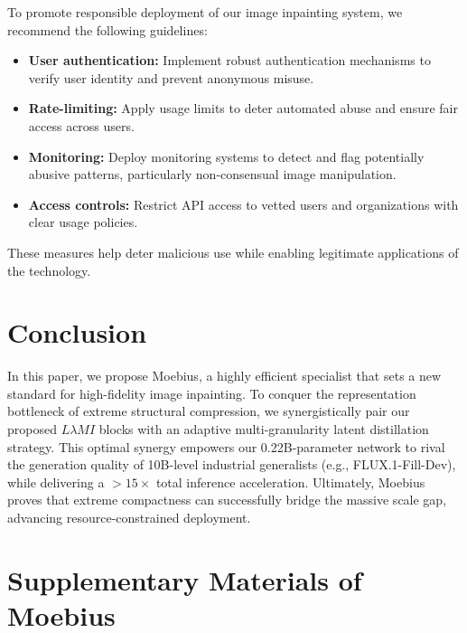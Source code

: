 \documentclass[runningheads]{llncs}
\begin{document}
To promote responsible deployment of our image inpainting system, we recommend the following guidelines:
\begin{itemize}
  \item \textbf{User authentication:} Implement robust authentication mechanisms to verify user identity and prevent anonymous misuse.
  \item \textbf{Rate-limiting:} Apply usage limits to deter automated abuse and ensure fair access across users.
  \item \textbf{Monitoring:} Deploy monitoring systems to detect and flag potentially abusive patterns, particularly non-consensual image manipulation.
  \item \textbf{Access controls:} Restrict API access to vetted users and organizations with clear usage policies.
\end{itemize}
These measures help deter malicious use while enabling legitimate applications of the technology.

\section{Conclusion}\label{sec:conclusion}
\vspace{-0.5em}


In this paper, we propose Moebius, a highly efficient specialist that sets a new standard for high-fidelity image inpainting. To conquer the representation bottleneck of extreme structural compression, we synergistically pair our proposed $L\lambda MI$ blocks with an adaptive multi-granularity latent distillation strategy. This optimal synergy empowers our 0.22B-parameter network to rival the generation quality of 10B-level industrial generalists (e.g., FLUX.1-Fill-Dev), while delivering a $>15\times$ total inference acceleration. Ultimately, Moebius proves that extreme compactness can successfully bridge the massive scale gap, advancing resource-constrained deployment.


%
%
\newpage 





\newpage
\section*{Supplementary Materials of Moebius}
\end{document}
